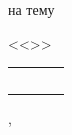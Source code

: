 \begin{center}
\begin{center}
		\vspace{0.4cm}



		{\smaller[1]
			на тему

			<<\Title>>}
	\end{center}

	\vfill

	\large

	\begin{tabular}{p{}P{0.25\textwidth}P{0.01\textwidth}P{0.25\textwidth}}
		 \\[10pt]
		             \\[10pt]
		                                  \\[10pt]
	\end{tabular}

	\vfill

	\City, \Year

\end{center}




